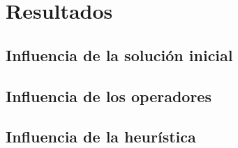 \documentclass{article}
\begin{document}
\section{Resultados}

\subsection{Influencia de la solución inicial}

\subsection{Influencia de los operadores}

\subsection{Influencia de la heurística}
\end{document}
